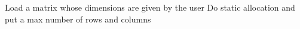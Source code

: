    Load a matrix whose dimensions are given by the user
   Do static allocation and put a max number of rows and columns

